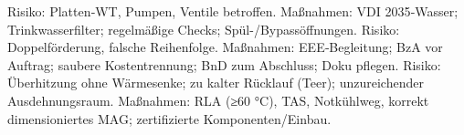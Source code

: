 \markdownRendererUlItem Risiko: Platten‑WT, Pumpen, Ventile betroffen.\markdownRendererUlItemEnd 
\markdownRendererUlItem Maßnahmen: VDI 2035‑Wasser; Trinkwasserfilter; regelmäßige Checks; Spül-/Bypassöffnungen.\markdownRendererUlItemEnd 
\markdownRendererUlEndTight \markdownRendererInterblockSeparator
{}
\markdownRendererSectionEnd \markdownRendererSectionBegin
{}\markdownRendererInterblockSeparator
{}\markdownRendererUlBeginTight
\markdownRendererUlItem Risiko: Doppelförderung, falsche Reihenfolge.\markdownRendererUlItemEnd 
\markdownRendererUlItem Maßnahmen: EEE‑Begleitung; BzA vor Auftrag; saubere Kostentrennung; BnD zum Abschluss; Doku pflegen.\markdownRendererUlItemEnd 
\markdownRendererUlEndTight \markdownRendererInterblockSeparator
{}
\markdownRendererSectionEnd \markdownRendererSectionBegin
{}\markdownRendererInterblockSeparator
{}\markdownRendererUlBeginTight
\markdownRendererUlItem Risiko: Überhitzung ohne Wärmesenke; zu kalter Rücklauf (Teer); unzureichender Ausdehnungsraum.\markdownRendererUlItemEnd 
\markdownRendererUlItem Maßnahmen: RLA (≥60 °C), TAS, Notkühlweg, korrekt dimensioniertes MAG; zertifizierte Komponenten/Einbau.\markdownRendererUlItemEnd 
\markdownRendererUlEndTight 
\markdownRendererSectionEnd 
\markdownRendererSectionEnd \markdownRendererDocumentEnd